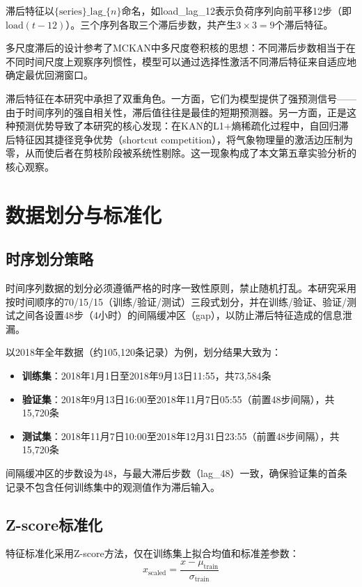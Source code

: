 滞后特征以$\{\text{series}\}\_\text{lag}\_\{n\}$命名，如load\_lag\_12表示负荷序列向前平移12步（即$\text{load}(t-12)$）。三个序列各取三个滞后步数，共产生$3 \times 3 = 9$个滞后特征。

多尺度滞后的设计参考了MCKAN\cite{chen2025mckan}中多尺度卷积核的思想：不同滞后步数相当于在不同时间尺度上观察序列惯性，模型可以通过选择性激活不同滞后特征来自适应地确定最优回溯窗口。

滞后特征在本研究中承担了双重角色。一方面，它们为模型提供了强预测信号——由于时间序列的强自相关性，滞后值往往是最佳的短期预测器。另一方面，正是这种预测优势导致了本研究的核心发现：在KAN的L1+熵稀疏化过程中，自回归滞后特征因其捷径竞争优势（shortcut competition），将气象物理量的激活边压制为零，从而使后者在剪枝阶段被系统性剔除。这一现象构成了本文第五章实验分析的核心观察。

\section{数据划分与标准化}

\subsection{时序划分策略}

时间序列数据的划分必须遵循严格的时序一致性原则，禁止随机打乱。本研究采用按时间顺序的70/15/15（训练/验证/测试）三段式划分，并在训练/验证、验证/测试之间各设置48步（4小时）的间隔缓冲区（gap），以防止滞后特征造成的信息泄漏。

以2018年全年数据（约105,120条记录）为例，划分结果大致为：
\begin{itemize}
  \item \textbf{训练集}：2018年1月1日至2018年9月13日11:55，共73,584条
  \item \textbf{验证集}：2018年9月13日16:00至2018年11月7日05:55（前置48步间隔），共15,720条
  \item \textbf{测试集}：2018年11月7日10:00至2018年12月31日23:55（前置48步间隔），共15,720条
\end{itemize}

间隔缓冲区的步数设为48，与最大滞后步数（lag\_48）一致，确保验证集的首条记录不包含任何训练集中的观测值作为滞后输入。

\subsection{Z-score标准化}

特征标准化采用Z-score方法，仅在训练集上拟合均值和标准差参数：
\begin{equation}
x_{\text{scaled}} = \frac{x - \mu_{\text{train}}}{\sigma_{\text{train}}}
\end{equation}

